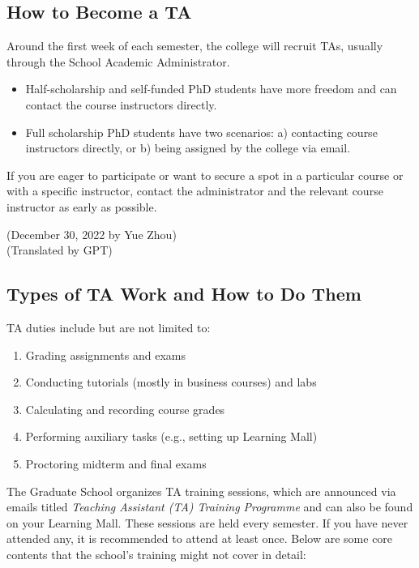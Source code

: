 \subsection{How to Become a TA}

Around the first week of each semester, the college will recruit TAs, usually through the School Academic Administrator.
\begin{itemize}
    \item Half-scholarship and self-funded PhD students have more freedom and can contact the course instructors directly.
    \item Full scholarship PhD students have two scenarios: a) contacting course instructors directly, or b) being assigned by the college via email.
\end{itemize}

If you are eager to participate or want to secure a spot in a particular course or with a specific instructor, contact the administrator and the relevant course instructor as early as possible.

\begin{flushright}
    (December 30, 2022 by Yue Zhou) \\
    (Translated by GPT)
\end{flushright}

\subsection{Types of TA Work and How to Do Them}

TA duties include but are not limited to:
\begin{enumerate}
    \item Grading assignments and exams
    \item Conducting tutorials (mostly in business courses) and labs
    \item Calculating and recording course grades
    \item Performing auxiliary tasks (e.g., setting up Learning Mall)
    \item Proctoring midterm and final exams
\end{enumerate}

The Graduate School organizes TA training sessions, which are announced via emails titled \textit{Teaching Assistant (TA) Training Programme} and can also be found on your Learning Mall. These sessions are held every semester. If you have never attended any, it is recommended to attend at least once. Below are some core contents that the school’s training might not cover in detail:

